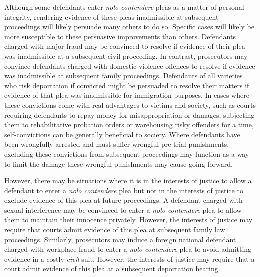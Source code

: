 Although some defendants enter \textit{nolo contendere} pleas as a matter of personal integrity, rendering evidence of these pleas inadmissible at subsequent proceedings will likely persuade many others to do so. Specific cases will likely be more susceptible to these persuasive improvements than others. Defendants charged with major fraud may be convinced to resolve if evidence of their plea was inadmissible at a subsequent civil proceeding. In contrast, prosecutors may convince defendants charged with domestic violence offences to resolve if evidence was inadmissible at subsequent family proceedings. Defendants of all varieties who risk deportation if convicted might be persuaded to resolve their matters if evidence of that plea was inadmissible for immigration purposes. In cases where these convictions come with real advantages to victims and society, such as courts requiring defendants to repay money for misappropriation or damages, subjecting them to rehabilitative probation orders or warehousing risky offenders for a time, self-convictions can be generally beneficial to society. Where defendants have been wrongfully arrested and must suffer wrongful pre-trial punishments, excluding these convictions from subsequent proceedings may function as a way to limit the damage these wrongful punishments may cause going forward.

However, there may be situations where it is in the interests of justice to allow a defendant to enter a \textit{nolo contendere} plea but not in the interests of justice to exclude evidence of this plea at future proceedings. A defendant charged with sexual interference may be convinced to enter a \textit{nolo contendere} plea to allow them to maintain their innocence privately. However, the interests of justice may require that courts admit evidence of this plea at subsequent family law proceedings. Similarly, prosecutors may induce a foreign national defendant charged with workplace fraud to enter a \textit{nolo contendere} plea to avoid admitting evidence in a costly \textit{civil} suit. However, the interests of justice may require that a court admit evidence of this plea at a subsequent deportation hearing. 

